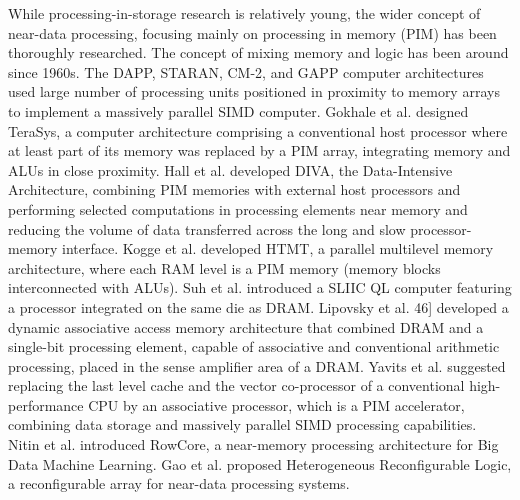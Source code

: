 \documentclass{superfri}
\begin{document}
While processing-in-storage research is relatively young, the wider concept of near-data processing, focusing mainly on processing in memory (PIM) has been thoroughly researched. The concept of mixing memory and logic has been around since 1960s. The DAPP, STARAN, CM-2, and GAPP computer architectures \cite{potter1989array} used large number of processing units positioned in proximity to memory arrays to implement a massively parallel SIMD computer. Gokhale et al. \cite{gokhale1995processing} designed TeraSys, a computer architecture comprising a conventional host processor where at least part of its memory was replaced by a PIM array, integrating memory and ALUs in close proximity. Hall et al. \cite{hall1999mapping} developed DIVA, the Data-Intensive Architecture, combining PIM memories with external host processors and performing selected computations in processing elements near memory and reducing the volume of data transferred across the long and slow processor-memory interface. Kogge et al. \cite{kogge2000pim} developed HTMT, a parallel multilevel memory architecture, where each RAM level is a PIM memory (memory blocks interconnected with ALUs). Suh et al. \cite{suh2001pim}  introduced a SLIIC QL computer featuring a processor integrated on the same die as DRAM. Lipovsky et al. 46] developed a dynamic associative access memory architecture that combined DRAM and a single-bit processing element, capable of associative and conventional arithmetic processing, placed in the sense amplifier area of a DRAM. Yavits et al. \cite{yavits2015computer} suggested replacing the last level cache and the vector co-processor of a conventional high-performance CPU by an associative processor, which is a PIM accelerator, combining data storage and massively parallel SIMD processing capabilities. Nitin et al. \cite{thottethodi2016rowcore} introduced RowCore, a near-memory processing architecture for Big Data Machine Learning. Gao et al. \cite{gao2016hrl} proposed Heterogeneous Reconfigurable Logic, a reconfigurable array for near-data processing systems.

\end{document}
